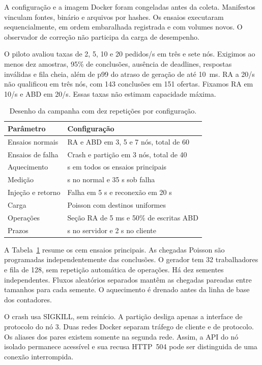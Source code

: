 \documentclass[conference]{IEEEtran}
\begin{document}
A configuração e a imagem Docker foram congeladas antes da coleta. Manifestos vinculam fontes, binário e arquivos por hashes. Os ensaios executaram sequencialmente, em ordem embaralhada registrada e com volumes novos. O observador de correção não participa da carga de desempenho.

O piloto avaliou taxas de 2, 5, 10 e 20 pedidos/s em três e sete nós. Exigimos ao menos dez amostras, 95\% de conclusões, ausência de deadlines, respostas inválidas e fila cheia, além de p99 do atraso de geração de até 10~ms. RA a 20/s não qualificou em três nós, com 143 conclusões em 151 ofertas. Fixamos RA em 10/s e ABD em 20/s. Essas taxas não estimam capacidade máxima.

\begin{table}[!t]
\caption{Desenho da campanha com dez repetições por configuração.}
\label{tab:experimentos}
\centering
\footnotesize
\begin{tabular}{@{}l>{\raggedright\arraybackslash}p{}@{}}
\toprule
Parâmetro & Configuração \\
\midrule
Ensaios normais & RA e ABD em 3, 5 e 7 nós, total de 60 \\
Ensaios de falha & Crash e partição em 3 nós, total de 40 \\
Aquecimento & 10 s em todos os ensaios principais \\
Medição & 60 s no normal e 35 s sob falha \\
Injeção e retorno & Falha em 5 s e reconexão em 20 s \\
Carga & Poisson com destinos uniformes \\
Operações & Seção RA de 5 ms e 50\% de escritas ABD \\
Prazos & 1 s no servidor e 2 s no cliente \\
\bottomrule
\end{tabular}
\end{table}

A Tabela~\ref{tab:experimentos} resume os cem ensaios principais. As chegadas Poisson são programadas independentemente das conclusões. O gerador tem 32 trabalhadores e fila de 128, sem repetição automática de operações. Há dez sementes independentes. Fluxos aleatórios separados mantêm as chegadas pareadas entre tamanhos para cada semente. O aquecimento é drenado antes da linha de base dos contadores.

O crash usa SIGKILL, sem reinício. A partição desliga apenas a interface de protocolo do nó 3. Duas redes Docker separam tráfego de cliente e de protocolo. Os aliases dos pares existem somente na segunda rede. Assim, a API do nó isolado permanece acessível e sua recusa HTTP~504 pode ser distinguida de uma conexão interrompida.
\end{document}
